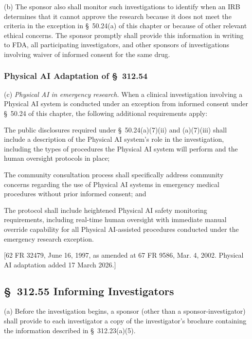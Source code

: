 \documentclass[11pt]{article}
\begin{document}
(b) The sponsor also shall monitor such investigations to identify when an IRB determines that it cannot approve the research because it does not meet the criteria in the exception in \S~50.24(a) of this chapter or because of other relevant ethical concerns. The sponsor promptly shall provide this information in writing to FDA, all participating investigators, and other sponsors of investigations involving waiver of informed consent for the same drug.

\subsubsection{Physical AI Adaptation of \S~312.54}

(c) \textit{Physical AI in emergency research.} When a clinical investigation involving a Physical AI system is conducted under an exception from informed consent under \S~50.24 of this chapter, the following additional requirements apply:

\begin{description}[leftmargin=0.8cm,style=sameline]
\item[(i)] The public disclosures required under \S~50.24(a)(7)(ii) and (a)(7)(iii) shall include a description of the Physical AI system's role in the investigation, including the types of procedures the Physical AI system will perform and the human oversight protocols in place;
\item[(ii)] The community consultation process shall specifically address community concerns regarding the use of Physical AI systems in emergency medical procedures without prior informed consent; and
\item[(iii)] The protocol shall include heightened Physical AI safety monitoring requirements, including real-time human oversight with immediate manual override capability for all Physical AI-assisted procedures conducted under the emergency research exception.
\end{description}

[62 FR 32479, June 16, 1997, as amended at 67 FR 9586, Mar. 4, 2002. Physical AI adaptation added 17 March 2026.]

\subsection{\S~312.55 Informing Investigators}

(a) Before the investigation begins, a sponsor (other than a sponsor-investigator) shall provide to each investigator a copy of the investigator's brochure containing the information described in \S~312.23(a)(5).
\end{document}

